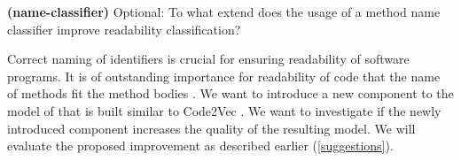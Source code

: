 \documentclass[%
class=scrreprt,
chapterprefix=false,%
open=right,%
twoside=false,%
paper=a4,%
logofile={Logo\_zentral\_farbig\_EN.png},%
thesistype=masterproposal,%
UKenglish,%
]{se2thesis}
\begin{document}
	\begin{resq} \textbf{(name-classifier)} Optional: To what extend does the usage of a method name classifier improve readability classification?\end{resq} \label{name-classifier}
	Correct naming of identifiers is crucial for ensuring readability of software programs. It is of outstanding importance for readability of code that the name of methods fit the method bodies \cite{liu2019learning}. We want to introduce a new component to the model of \citeauthor{mi2022towards} \cite{mi2022towards} that is built similar to Code2Vec \cite{alon2019code2vec}. We want to investigate if the newly introduced component increases the quality of the resulting model. We will evaluate the proposed improvement as described earlier (\ref{suggestions}).
	
	\backmatter
	
	\printbibliography
	
\end{document}
